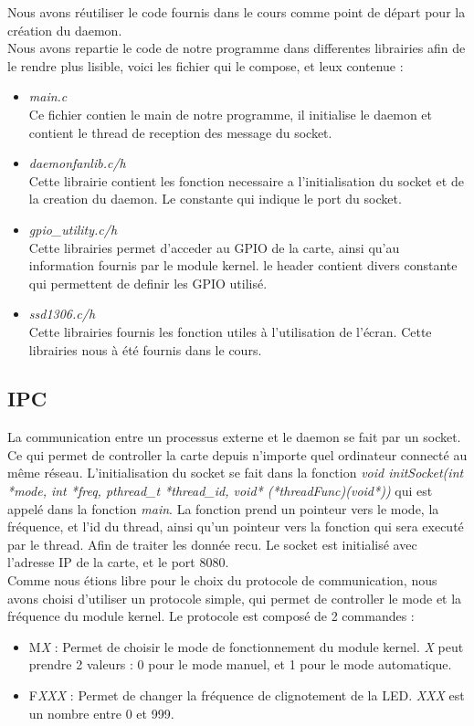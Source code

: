 \documentclass[
	a4paper, %
	10pt, %
]{CSUniSchoolLabReport}
\begin{document}
Nous avons réutiliser le code fournis dans le cours comme point de départ pour la création du daemon. \\

Nous avons repartie le code de notre programme dans differentes librairies afin de le rendre plus lisible, voici les fichier qui le compose, et leux contenue : \\
\begin{itemize}
	\item \textit{main.c}\\
	Ce fichier contien le main de notre programme, il initialise le daemon et contient le thread de reception des message du socket.
	\item \textit{daemonfanlib.c/h}\\
	Cette librairie contient les fonction necessaire a l'initialisation du socket et de la creation du daemon. Le constante qui indique le port du socket.
	\item \textit{gpio\_utility.c/h}\\
	Cette librairies permet d'acceder au GPIO de la carte, ainsi qu'au information fournis par le module kernel. le header contient divers constante qui permettent de definir les GPIO utilisé.
	\item \textit{ssd1306.c/h}\\
	Cette librairies fournis les fonction utiles à l'utilisation de l'écran. Cette librairies nous à été fournis dans le cours.

\end{itemize}
\subsection{IPC}\label{IPC}
La communication entre un processus externe et le daemon se fait par un socket. 
Ce qui permet de controller la carte depuis n'importe quel ordinateur connecté au même réseau. 
L'initialisation du socket se fait dans la fonction \textit{void initSocket(int *mode, int *freq, pthread\_t *thread\_id, void* (*threadFunc)(void*))} qui est appelé dans la fonction \textit{main}.
La fonction prend un pointeur vers le mode, la fréquence, et l'id du thread, ainsi qu'un pointeur vers la fonction qui sera executé par le thread. Afin de traiter les donnée recu.
Le socket est initialisé avec l'adresse IP de la carte, et le port 8080. \\

Comme nous étions libre pour le choix du protocole de communication, nous avons choisi d'utiliser un protocole simple, qui permet de controller le mode et la fréquence du module kernel.
Le protocole est composé de 2 commandes : \\
\begin{itemize}
	\item M\textit{X} : Permet de choisir le mode de fonctionnement du module kernel. \textit{X} peut prendre 2 valeurs : 0 pour le mode manuel, et 1 pour le mode automatique.
	\item F\textit{XXX} : Permet de changer la fréquence de clignotement de la LED. \textit{XXX} est un nombre entre 0 et 999.
\end{itemize}
\end{document}
